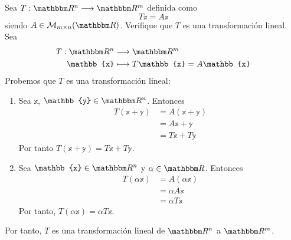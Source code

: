 \begin{example}
    Sea $T: \RR[n] \longrightarrow \RR[m]$ definida como
    $$T\mathbb{x} = A\mathbb{x}$$
    siendo $A \in \matrizmn$. Verifique que $T$ es una transformación lineal. \\
    \solucion Sea
    \begin{align*}
        T: \RR[n] & \longrightarrow \RR[m] \\
        \mathbb{x} & \longmapsto T\mathbb{x} = A\mathbb{x}
    \end{align*}
    Probemos que $T$ es una transformación lineal:
    \begin{enumerate}[label=\roman*)]
        \item Sea $\mathbb{x}$, $\mathbb{y} \in \RR[n]$. Entonces
        \begin{align*}
            T(\mathbb{x} + \mathbb{y}) & = A(\mathbb{x} + \mathbb{y}) \\
            & = A\mathbb{x} + \mathbb{y} \\
            & = T\mathbb{x} + T\mathbb{y}
        \end{align*}
        Por tanto $T(\mathbb{x} + \mathbb{y}) = T\mathbb{x} + T\mathbb{y}$.
        \item Sea $\mathbb{x} \in \RR[n]$ y $\alpha \in \RR$. Entonces
        \begin{align*}
            T(\alpha \mathbb{x}) & = A(\alpha \mathbb{x}) \\
            & = \alpha A \mathbb{x} \\
            & = \alpha T \mathbb{x}
        \end{align*}
        Por tanto, $T(\alpha \mathbb{x}) = \alpha T\mathbb{x}$.
    \end{enumerate}
    Por tanto, $T$ es una transformación lineal de $\RR[n]$ a $\RR[m]$.
\end{example}

